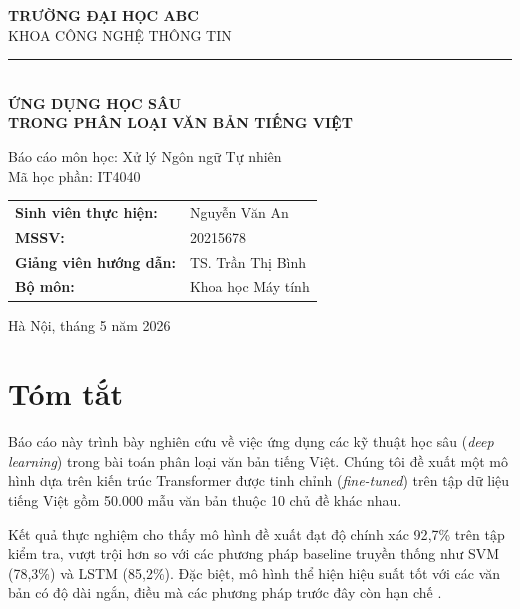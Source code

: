 \documentclass[12pt, a4paper]{report}
\begin{document}
\begin{titlepage}
  \centering

  {\Large\bfseries TRƯỜNG ĐẠI HỌC ABC\\[0.1cm]}
  {\large KHOA CÔNG NGHỆ THÔNG TIN\\[0.3cm]}
  \rule{\textwidth}{0.8pt}\\[1.5cm]

  {\Huge\bfseries ỨNG DỤNG HỌC SÂU\\[0.4cm]}
  {\Large\bfseries TRONG PHÂN LOẠI VĂN BẢN TIẾNG VIỆT\\[1cm]}

  {\large Báo cáo môn học: Xử lý Ngôn ngữ Tự nhiên\\[0.3cm]}
  {\large Mã học phần: IT4040\\[2cm]}

  \begin{tabular}{ll}
    \textbf{Sinh viên thực hiện:} & Nguyễn Văn An \\
    \textbf{MSSV:}                & 20215678 \\[0.3cm]
    \textbf{Giảng viên hướng dẫn:} & TS. Trần Thị Bình \\
    \textbf{Bộ môn:}              & Khoa học Máy tính \\
  \end{tabular}

  \vfill
  {\large Hà Nội, tháng 5 năm 2026}
\end{titlepage}

\chapter*{Tóm tắt}

Báo cáo này trình bày nghiên cứu về việc ứng dụng các kỹ thuật học sâu
(\textit{deep learning}) trong bài toán phân loại văn bản tiếng Việt.
Chúng tôi đề xuất một mô hình dựa trên kiến trúc Transformer được tinh chỉnh
(\textit{fine-tuned}) trên tập dữ liệu tiếng Việt gồm 50.000 mẫu văn bản
thuộc 10 chủ đề khác nhau.

Kết quả thực nghiệm cho thấy mô hình đề xuất đạt độ chính xác 92{,}7\%
trên tập kiểm tra, vượt trội hơn so với các phương pháp baseline truyền thống
như SVM (78{,}3\%) và LSTM (85{,}2\%). Đặc biệt, mô hình thể hiện hiệu suất
tốt với các văn bản có độ dài ngắn, điều mà các phương pháp trước đây
còn hạn chế \cite{Nguyen2024deep}.
\end{document}
